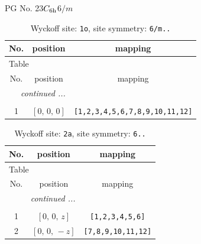 \documentclass[fleqn,8pt]{jsarticle}
\begin{document}
\setcounter{MaxMatrixCols}{32}

\renewcommand{\tablename}{Table~}
\renewcommand{\figurename}{Figure~}
\begin{center}
\LARGE
PG No. 23\quad$C_{\rm 6h}$\quad$6/m$\quad[ hexagonal ]
\end{center}
\renewcommand{\arraystretch}{1.2}
\begin{longtable}{ccc}
\caption{Wyckoff site: {\tt 1o}, site symmetry: {\tt 6/m..}}
 \\
 \hline \hline
No. & position & mapping \\ \hline \endfirsthead

\multicolumn{2}{l}{\tablename\ \thetable{}} \\
 \hline \hline
No. & position & mapping \\ \hline \endhead

 \hline \hline
\multicolumn{2}{r}{\footnotesize\it continued ...} \\ \endfoot

 \hline \hline
\multicolumn{2}{r}{} \\ \endlastfoot

1 & $\left[ 0,\, 0,\, 0 \right]$ & {\tt [1,2,3,4,5,6,7,8,9,10,11,12]} \\
\end{longtable}
\renewcommand{\arraystretch}{1.2}
\begin{longtable}{ccc}
\caption{Wyckoff site: {\tt 2a}, site symmetry: {\tt 6..}}
 \\
 \hline \hline
No. & position & mapping \\ \hline \endfirsthead

\multicolumn{2}{l}{\tablename\ \thetable{}} \\
 \hline \hline
No. & position & mapping \\ \hline \endhead

 \hline \hline
\multicolumn{2}{r}{\footnotesize\it continued ...} \\ \endfoot

 \hline \hline
\multicolumn{2}{r}{} \\ \endlastfoot

1 & $\left[ 0,\, 0,\, z \right]$ & {\tt [1,2,3,4,5,6]} \\ \hline
2 & $\left[ 0,\, 0,\, - z \right]$ & {\tt [7,8,9,10,11,12]} \\
\end{longtable}
\renewcommand{\arraystretch}{1.2}
\end{document}

